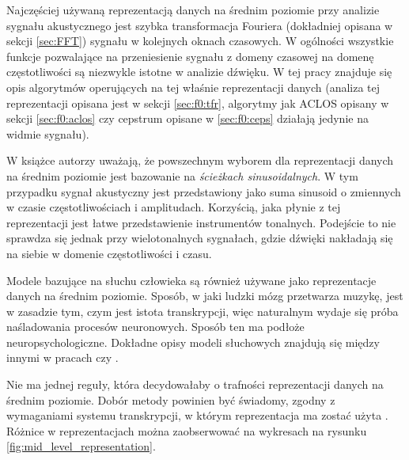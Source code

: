 \documentclass[12pt,a4paper,twoside]{mwart}
\begin{document}
Najczęściej używaną reprezentacją danych na średnim poziomie przy analizie sygnału akustycznego jest szybka transformacja Fouriera (dokładniej opisana w sekcji \ref{sec:FFT}) sygnału w kolejnych oknach czasowych. W ogólności wszystkie funkcje pozwalające na przeniesienie sygnału z domeny czasowej na domenę częstotliwości są niezwykle istotne w analizie dźwięku. W tej pracy znajduje się opis algorytmów operujących na tej właśnie reprezentacji danych (analiza tej reprezentacji opisana jest w sekcji \ref{sec:f0:tfr}, algorytmy jak ACLOS opisany w sekcji \ref{sec:f0:aclos} czy cepstrum opisane w \ref{sec:f0:ceps} działają jedynie na widmie sygnału).

W książce 
\cite[13-17]{Transcription:Anssi:SignalProcessingMethods}
autorzy uważają, że powszechnym wyborem dla reprezentacji danych na średnim poziomie jest bazowanie na \textit{ścieżkach sinusoidalnych}. W tym przypadku sygnał akustyczny jest przedstawiony jako suma sinusoid o zmiennych w czasie częstotliwościach i amplitudach. Korzyścią, jaka płynie z tej reprezentacji jest łatwe przedstawienie instrumentów tonalnych. Podejście to nie sprawdza się jednak przy wielotonalnych sygnałach, gdzie dźwięki nakładają się na siebie w domenie częstotliwości i czasu.

Modele bazujące na słuchu człowieka są również używane jako reprezentacje danych na średnim poziomie. Sposób, w jaki ludzki mózg przetwarza muzykę, jest w zasadzie tym, czym jest istota transkrypcji, więc naturalnym wydaje się próba naśladowania procesów neuronowych. Sposób ten ma podłoże neuropsychologiczne. Dokładne opisy modeli słuchowych znajdują się między innymi w pracach \cite{Transcription:Karjalainen:MultipitchAnalysisModel} czy \cite{Transcription:Zatorre:AuditoryCortex}.

Nie ma jednej reguły, która decydowałaby o trafności reprezentacji danych na średnim poziomie. Dobór metody powinien być świadomy, zgodny z wymaganiami systemu transkrypcji, w którym reprezentacja ma zostać użyta 
\cite[13-15]{Transcription:Anssi:SignalProcessingMethods}.
Różnice w reprezentacjach można zaobserwować na wykresach na rysunku \ref{fig:mid_level_representation}. 
\end{document}
